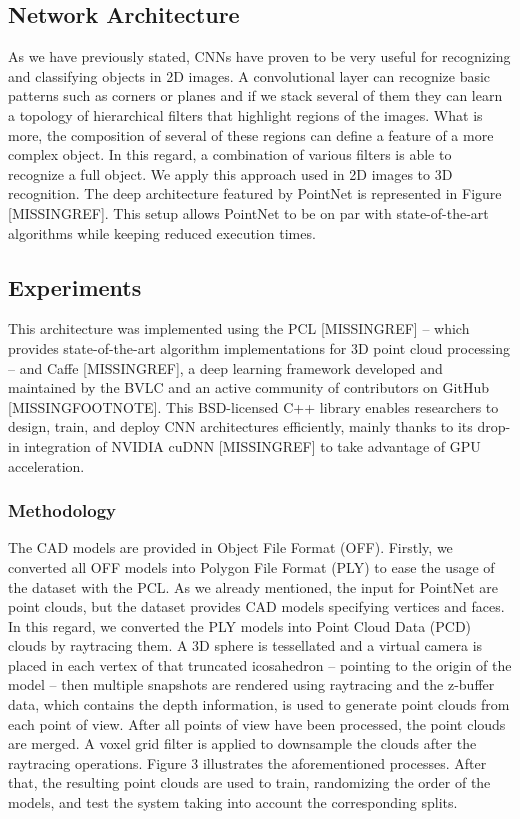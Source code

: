 \subsection{Network Architecture}
\label{cha:objrecog:sec:pointnet:subsec:network}

As we have previously stated, \acp{CNN} have proven to be very useful for recognizing and classifying objects in 2D images. A convolutional layer can recognize basic patterns such as corners or planes and if we stack several of them they can learn a topology of hierarchical filters that highlight regions of the images. What is more, the composition of several of these regions can define a feature of a more complex object. In this regard, a combination of various filters is able to recognize a full object. We apply this approach used in 2D images to 3D recognition. The deep architecture featured by PointNet is represented in Figure [MISSINGREF]. This setup allows PointNet to be on par with state-of-the-art algorithms while keeping reduced execution times.

\subsection{Experiments}
\label{cha:objrecog:sec:pointnet:subsec:experiments}

This architecture was implemented using the \ac{PCL} [MISSINGREF] – which provides state-of-the-art algorithm implementations for 3D point cloud processing – and Caffe [MISSINGREF], a deep learning framework developed and maintained by the \ac{BVLC} and an active community of contributors on GitHub [MISSINGFOOTNOTE]. This BSD-licensed C++ library enables researchers to design, train, and deploy \ac{CNN} architectures efficiently, mainly thanks to its drop-in integration of NVIDIA cuDNN [MISSINGREF] to take advantage of \ac{GPU} acceleration.

\subsubsection{Methodology}

The CAD models are provided in Object File Format (OFF). Firstly, we converted all OFF models into Polygon File Format (PLY) to ease the usage of the dataset with the PCL. As we already mentioned, the input for PointNet are point clouds, but the dataset provides CAD models specifying vertices and faces. In this regard, we converted the PLY models into Point Cloud Data (PCD) clouds by raytracing them. A 3D sphere is tessellated and a virtual camera is placed in each vertex of that truncated icosahedron – pointing to the origin of the model – then multiple snapshots are rendered using raytracing and the z-buffer data, which contains the depth information, is used to generate point clouds from each point of view. After all points of view have been processed, the point clouds are merged. A voxel grid filter is applied to downsample the clouds after the raytracing operations. Figure 3 illustrates the aforementioned processes. After that, the resulting point clouds are used to train, randomizing the order of the models, and test the system taking into account the corresponding splits.

